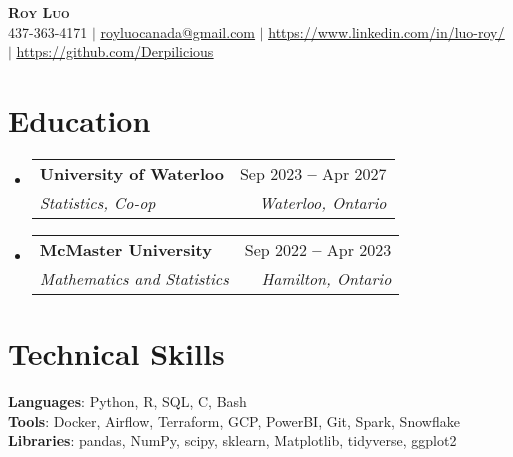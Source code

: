 \documentclass[letterpaper,11pt]{article}
\makeatletter
\newcommand{\resumeSubheading}[4]{
  \vspace{-2pt}\item
    \begin{tabular*}{0.97\textwidth}[t]{l@{\extracolsep{\fill}}r}
      \textbf{#1} & #2 \\
      \textit{\small#3} & \textit{\small #4} \\
    \end{tabular*}\vspace{-7pt}
}
\newcommand{\resumeSubHeadingListStart}{\begin{itemize}[leftmargin=0.15in, label={}]}
\newcommand{\resumeSubHeadingListEnd}{\end{itemize}}
\makeatother
\begin{document}

\begin{center}
    \textbf{\Huge \scshape Roy Luo} \\ \vspace{1pt}
    \small 437-363-4171 $|$ \href{mailto:royluocanada@gmail.com}{\underline{royluocanada@gmail.com}} $|$ 
    \href{https://linkedin.com/in/luo-roy/}{\underline{https://www.linkedin.com/in/luo-roy/}} $|$
    \href{https://github.com/Derpilicious}{\underline{https://github.com/Derpilicious}}
\end{center}
 
\section{Education}
  \resumeSubHeadingListStart
    \resumeSubheading
      {University of Waterloo}{Sep 2023 \textbf{--} Apr 2027}
      {Statistics, Co-op}{Waterloo, Ontario}
    \resumeSubheading
      {McMaster University}{Sep 2022 \textbf{--} Apr 2023}
      {Mathematics and Statistics}{Hamilton, Ontario}
\resumeSubHeadingListEnd
      
\section{Technical Skills}
\begin{itemize}[leftmargin=0.15in, label={}]
   \small{\item{
    \textbf{Languages}{: Python, R, SQL, C, Bash} \\
    \textbf{Tools}{: Docker, Airflow, Terraform, GCP, PowerBI, Git, Spark, Snowflake} \\
    \textbf{Libraries}{: pandas, NumPy, scipy, sklearn, Matplotlib, tidyverse, ggplot2} \\
   }}
 \end{itemize}
\end{document}
